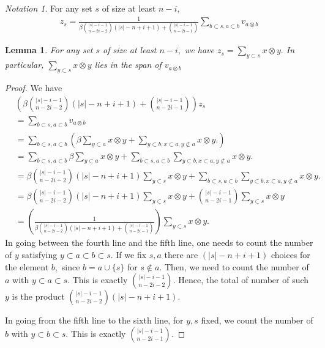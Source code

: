 \documentclass{amsart}
\newtheorem{lem}[thm]{Lemma}
\theoremstyle{remark}
\newtheorem{note}[thm]{Notation}
\begin{document}
\begin{note}
For any set $s$ of size at least $n-i,$
\begin{align*}
	z_s = \frac{1}{\beta\binom {|s|-i-1}{n-2i-2}(|s|-n+i+1)+\binom{|s|-i-1}{n-2i-1}} \sum_{b\subset s,a \subset b}^{}v_{a\otimes b}
\end{align*}
\end{note}



\begin{lem}
\label{z_equivalence}
For any set $s$ of size at least $n-i,$ we have $z_s = \sum_{y \subset s}^{}x\otimes y.$ In particular, $\sum_{y \subset s}^{}x\otimes y$ lies in the span of $v_{a\otimes b}$
\end{lem}
\begin{proof}
We have 
\begin{align*}
	&\left(\beta\binom {|s|-i-1}{n-2i-2}(|s|-n+i+1)+\binom{|s|-i-1}{n-2i-1}\right) z_s \\
	&= \sum_{b\subset s,a \subset b}^{}v_{a\otimes b}\\
	&=\sum_{b\subset s,a \subset b}^{} \left(\beta \sum_{y \subset a}^{}x \otimes y + \sum_{y\subset b,x \subset a,y\not\subset a}^{}x\otimes y.\right)\\
	&= \sum_{b\subset s,a \subset b}^{} \beta \sum_{y \subset a}^{}x \otimes y + \sum_{b\subset s,a \subset b}^{} \sum_{y\subset b,x \subset a,y\not\subset a}^{}x\otimes y.\\
	&= \beta\binom {|s|-i-1}{n-2i-2}(|s|-n+i+1) \sum_{y \subset s}^{}x \otimes y+ \sum_{b\subset s,a \subset b}^{} \sum_{y\subset b,x \subset a,y\not\subset a}^{}x\otimes y.\\
	&= \beta\binom {|s|-i-1}{n-2i-2}(|s|-n+i+1) \sum_{y \subset s}^{}x \otimes y + \binom{|s|-i-1}{n-2i-1}\sum_{y\subset s}^{}x\otimes y\\
	& =\left(\frac{1}{\beta\binom {|s|-i-1}{n-2i-2}(|s|-n+i+1)+\binom{|s|-i-1}{n-2i-1}}\right) \sum_{y \subset s}^{}x\otimes y.
\end{align*}
In going between the fourth line and the fifth line, one needs to count the number of $y$ satisfying $y \subset a \subset b\subset s.$ If we fix $s,a$ there are $(|s|-n+i+1)$ choices for the element $b,$ since $b = a \cup \{s\}$ for $s \notin a.$ Then, we need to count the number of $a$ with $y \subset a \subset s.$ This is exactly $\binom {|s|-i-1}{n-2i-2}.$ Hence, the total of number of such $y$ is the product $\binom {|s|-i-1}{n-2i-2}(|s|-n+i+1).$

In going from the fifth line to the sixth line, for $y,s$ fixed, we count the number of $b$ with $y \subset b \subset s.$ This is exactly $\binom{|s|-i-1}{n-2i-1}$.
\end{proof}
\end{document}
